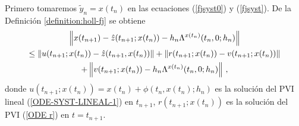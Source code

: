 Primero tomaremos $\widetilde{y}_n = x(t_n)$ en las ecuaciones (\ref{fjsyst0}) y (\ref{fjsyst}). De la Definición \ref{definition:holl-fj} se obtiene
\begin{multline}
    \left\lVert  x(t_{n+1}) - \hat{z}(t_{n+1};x(t_n))-h_n\Lambda^{x(t_n)}(t_n,0;h_n) \right\rVert \\
    \leq \left\lVert u(t_{n+1};x(t_n))-\hat{z}(t_{n+1},x(t_n)) \right\rVert
    + \left\lVert r(t_{n+1};x(t_n))-v(t_{n+1};x(t_n)) \right\rVert  \\+ \left\lVert v(t_{n+1};x(t_n))-h_n\Lambda^{x(t_n)}(t_n,0;h_n) \right\rVert\,,
    \label{ineq:main}
\end{multline}
donde  $u(t_{n+1};x(t_n))=x(t_n)+\phi(t_n,x(t_n);h_n)$ es la solución del PVI lineal (\ref{ODE-SYST-LINEAL-1}) en  $t_{n+1}$, $r(t_{n+1};x(t_n))$ es la solución del PVI (\ref{ODE r}) en  $t = t_{n+1}$.

